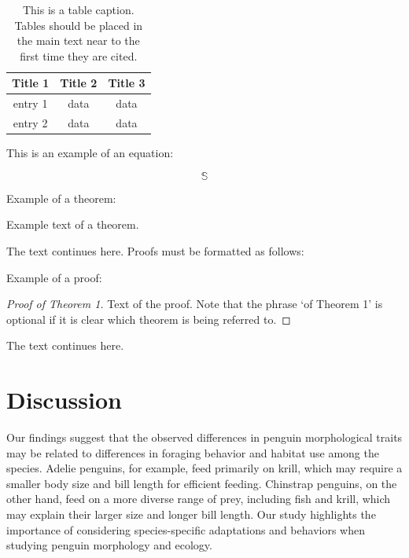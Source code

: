 \documentclass[water,article,submit,moreauthors,pdftex]{mdpi}
\begin{document}
\begin{table}[H]
\caption{This is a table caption. Tables should be placed in the main text near to the first time they are cited.}
\centering
\begin{tabular}{ccc}
\toprule
\textbf{Title 1}    & \textbf{Title 2}  & \textbf{Title 3}\\
\midrule
entry 1     & data          & data\\
entry 2     & data          & data\\
\bottomrule
\end{tabular}
\end{table}

This is an example of an equation:

\begin{equation}
\mathbb{S}
\end{equation}

Example of a theorem:

\begin{Theorem}
Example text of a theorem.
\end{Theorem}

The text continues here. Proofs must be formatted as follows:

Example of a proof:

\begin{proof}[Proof of Theorem 1]
Text of the proof. Note that the phrase `of Theorem 1' is optional if it is clear which theorem is being referred to.
\end{proof}

The text continues here.

\hypertarget{discussion}{%
\section{Discussion}\label{discussion}}

Our findings suggest that the observed differences in penguin
morphological traits may be related to differences in foraging behavior
and habitat use among the species. Adelie penguins, for example, feed
primarily on krill, which may require a smaller body size and bill
length for efficient feeding. Chinstrap penguins, on the other hand,
feed on a more diverse range of prey, including fish and krill, which
may explain their larger size and longer bill length. Our study
highlights the importance of considering species-specific adaptations
and behaviors when studying penguin morphology and ecology.
\end{document}
